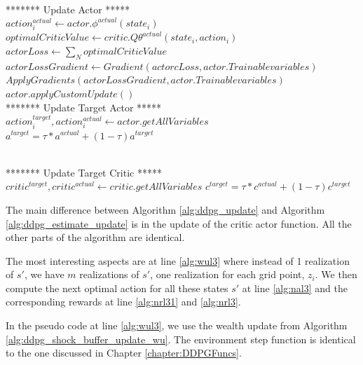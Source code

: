 \begin{breakablealgorithm}
\begin{algorithmic}[1]
\State \\******* Update Actor  *****\\
    \State $action_i^{actual} \gets actor.\phi^{actual}(state_i)$
    \State $optimalCriticValue \gets critic.Q\theta^{actual}(state_i,action_i)$
    \State $actorLoss \gets \sum_N optimalCriticValue $ 
    \State $actorLossGradient \gets Gradient(actorcLoss,actor.Trainablevariables)$
    \State $ApplyGradients(actorLossGradient,actor.Trainablevariables)$
\Else
    \State $actor.applyCustomUpdate()$ 
\EndIf
\State \\******* Update Target Actor  *****\\
\State $action_i^{target},action_i^{actual} \gets actor.getAllVariables$
        \State $a^{target} = \tau*a^{actual}+(1-\tau)a^{target}$
\EndFor

\State \\******* Update Target Critic  *****\\
\State $critic^{target},critic^{actual} \gets critic.getAllVariables$
        \State $c^{target} = \tau*c^{actual}+(1-\tau)c^{target}$
\EndFor
\end{algorithmic}
\end{breakablealgorithm}

The main difference between Algorithm \ref{alg:ddpg_update} and Algorithm \ref{alg:ddpg_estimate_update} is in  the update of the critic actor function. All the other parts of the algorithm are identical.

The most interesting aspects are at line \ref{alg:wul3} where instead of 1 realization of $s'$, we have $m$ realizations of $s'$, one realization for each grid point, $z_i$. We then compute the next optimal action for all these states $s'$ at line \ref{alg:nal3} and the corresponding rewards at line \ref{alg:nrl31} and \ref{alg:nrl3}.

In the pseudo code at line  \ref{alg:wul3}, we use the wealth update from Algorithm \ref{alg:ddpg_shock_buffer_update_wu}. The environment step function is identical to the one discussed in Chapter \ref{chapter:DDPGFuncs}. 
